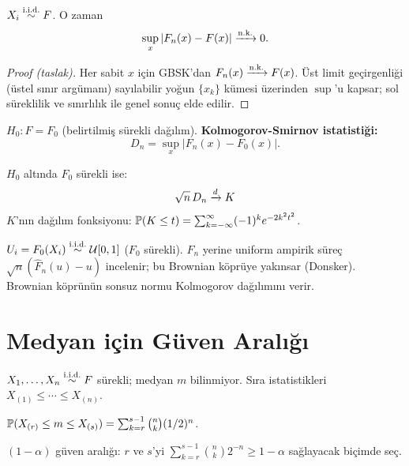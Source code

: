 \begin{teorem}\label{thm:glivenko_cantelli}
$X_i\overset{\text{i.i.d.}}{\sim} F$. O zaman
\[
  \sup_x |F_n(x)-F(x)| \xrightarrow{\text{n.k.}} 0.
\]
\end{teorem}

\begin{proof}[Proof (taslak)]
Her sabit $x$ için GBSK'dan $F_n(x)\xrightarrow{\text{n.k.}} F(x)$. Üst limit geçirgenliği (üstel sınır argümanı) sayılabilir yoğun $\{x_k\}$ kümesi üzerinden $\sup$'u kapsar; sol süreklilik ve sınırlılık ile genel sonuç elde edilir.
\end{proof}

\begin{tanim}[KS istatistiği]\label{def:ks_istatistik}
$H_0:F=F_0$ (belirtilmiş sürekli dağılım). \textbf{Kolmogorov-Smirnov istatistiği:}
\[
  D_n = \sup_x |F_n(x) - F_0(x)|.
\]
\end{tanim}

\begin{teorem}\label{thm:kolmogorov_dagilim}
$H_0$ altında $F_0$ sürekli ise:
\[
  \sqrt{n}\,D_n \xrightarrow{d} K
\]
$K$'nın dağılım fonksiyonu: $\mathbb{P}(K\leq t) = \sum_{k=-\infty}^{\infty}(-1)^k e^{-2k^2t^2}$.
\end{teorem}

\begin{ispatiskele}
$U_i = F_0(X_i)\overset{\text{i.i.d.}}{\sim}\mathcal{U}[0,1]$ ($F_0$ sürekli). $F_n$ yerine uniform ampirik süreç $\sqrt{n}(\hat{F}_n(u)-u)$ incelenir; bu Brownian köprüye yakınsar (Donsker). Brownian köprünün sonsuz normu Kolmogorov dağılımını verir.
\end{ispatiskele}

\section{Medyan için Güven Aralığı}
\label{sec:medyan_ga}

\begin{teorem}\label{thm:medyan_ga}
$X_1,\ldots,X_n\overset{\text{i.i.d.}}{\sim} F$ sürekli; medyan $m$ bilinmiyor. Sıra istatistikleri $X_{(1)}\leq\cdots\leq X_{(n)}$.

$\mathbb{P}(X_{(r)}\leq m\leq X_{(s)}) = \sum_{k=r}^{s-1}\binom{n}{k}(1/2)^n$.

$(1-\alpha)$ güven aralığı: $r$ ve $s$'yi $\sum_{k=r}^{s-1}\binom{n}{k}2^{-n}\geq1-\alpha$ sağlayacak biçimde seç.
\end{teorem}

